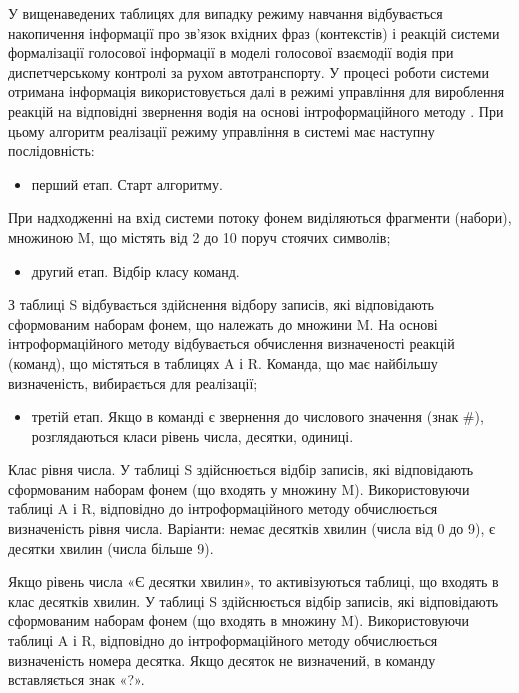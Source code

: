 У вищенаведених таблицях для випадку режиму навчання відбувається накопичення інформації про зв’язок вхідних фраз (контекстів) і реакцій системи формалізації голосової інформації в моделі голосової взаємодії водія при диспетчерському контролі за рухом автотранспорту. У процесі роботи системи отримана інформація використовується далі в режимі управління для вироблення реакцій на відповідні звернення водія на основі інтроформаційного методу \cite{Teslia_2010}. При цьому алгоритм реалізації режиму управління в системі має наступну послідовність:

\begin{itemize}
	\item перший етап. Старт алгоритму.
\end{itemize}

При надходженні на вхід системи потоку фонем виділяються фрагменти (набори), множиною M, що містять від 2 до 10 поруч стоячих символів;

\begin{itemize}
	\item другий етап. Відбір класу команд.
\end{itemize}

З таблиці S відбувається здійснення відбору записів, які відповідають сформованим наборам фонем, що належать до множини M.
На основі інтроформаційного методу відбувається обчислення визначеності реакцій (команд), що містяться в таблицях A і R. Команда, що має найбільшу визначеність, вибирається для реалізації;

\begin{itemize}
	\item третій етап. Якщо в команді є звернення до числового значення (знак \#), розглядаються класи рівень числа, десятки, одиниці.
\end{itemize}

Клас рівня числа. У таблиці S здійснюється відбір записів, які відповідають сформованим наборам фонем (що входять у множину M). Використовуючи таблиці A і R, відповідно до інтроформаційного методу обчислюється визначеність рівня числа. Варіанти: немає десятків хвилин (числа від 0 до 9), є десятки хвилин (числа більше 9).

Якщо рівень числа «Є десятки хвилин», то активізуються таблиці, що входять в клас десятків хвилин. У таблиці S здійснюється відбір записів, які відповідають сформованим наборам фонем (що входять в множину M). Використовуючи таблиці A і R, відповідно до інтроформаційного методу обчислюється визначеність номера десятка. Якщо десяток не визначений, в команду вставляється знак «?».

